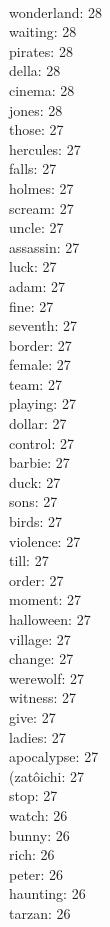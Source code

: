 \begin{multicols}{6}
  \\ wonderland: 28
  \\ waiting: 28
  \\ pirates: 28
  \\ della: 28
  \\ cinema: 28
  \\ jones: 28
  \\ those: 27
  \\ hercules: 27
  \\ falls: 27
  \\ holmes: 27
  \\ scream: 27
  \\ uncle: 27
  \\ assassin: 27
  \\ luck: 27
  \\ adam: 27
  \\ fine: 27
  \\ seventh: 27
  \\ border: 27
  \\ female: 27
  \\ team: 27
  \\ playing: 27
  \\ dollar: 27
  \\ control: 27
  \\ barbie: 27
  \\ duck: 27
  \\ sons: 27
  \\ birds: 27
  \\ violence: 27
  \\ till: 27
  \\ order: 27
  \\ moment: 27
  \\ halloween: 27
  \\ village: 27
  \\ change: 27
  \\ werewolf: 27
  \\ witness: 27
  \\ give: 27
  \\ ladies: 27
  \\ apocalypse: 27
  \\ (zatôichi: 27
  \\ stop: 27
  \\ watch: 26
  \\ bunny: 26
  \\ rich: 26
  \\ peter: 26
  \\ haunting: 26
  \\ tarzan: 26

\end{multicols}
